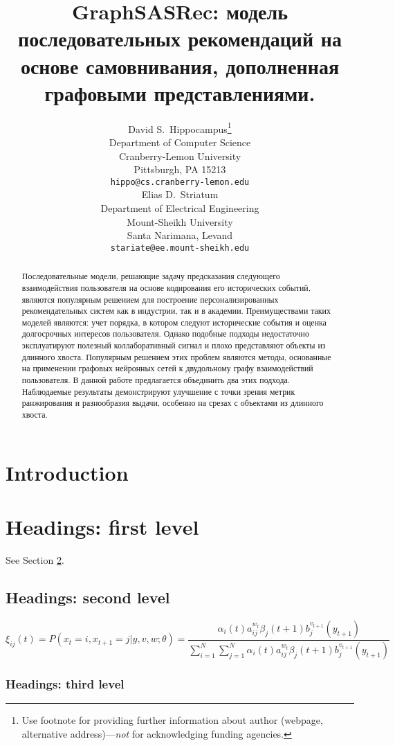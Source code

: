 \documentclass{article}
\title{GraphSASRec: модель последовательных рекомендаций на основе самовнивания, дополненная графовыми представлениями.}
\author{ David S.~Hippocampus\thanks{Use footnote for providing further
		information about author (webpage, alternative
		address)---\emph{not} for acknowledging funding agencies.} \\
	Department of Computer Science\\
	Cranberry-Lemon University\\
	Pittsburgh, PA 15213 \\
	\texttt{hippo@cs.cranberry-lemon.edu} \\
	\And
	Elias D.~Striatum \\
	Department of Electrical Engineering\\
	Mount-Sheikh University\\
	Santa Narimana, Levand \\
	\texttt{stariate@ee.mount-sheikh.edu} \\
}
\date{}
\begin{document}
\maketitle

\begin{abstract}
	Последовательные модели, решающие задачу предсказания следующего взаимодействия пользователя на 
	основе кодирования его исторических событий, являются популярным решением для построение 
	персонализированных рекомендательных систем как в индустрии, так и в академии. Преимуществами 
	таких моделей являются: учет порядка, в котором следуют исторические события и оценка долгосрочных 
	интересов пользователя. Однако подобные подходы недостаточно эксплуатируют полезный коллаборативный 
	сигнал и плохо представляют объекты из длинного хвоста. Популярным решением этих проблем являются 
	методы, основанные на применении графовых нейронных сетей к двудольному графу взаимодействий 
	пользователя. В данной работе предлагается объединить два этих подхода. Наблюдаемые результаты 
	демонстрируют улучшение с точки зрения метрик ранжирования и разнообразия выдачи, особенно на 
	срезах с объектами из длинного хвоста.
\end{abstract}



\section{Introduction}
\lipsum[2]
\lipsum[3]

\section{Headings: first level}
\label{sec:headings}

\lipsum[4] See Section \ref{sec:headings}.

\subsection{Headings: second level}
\lipsum[5]
\begin{equation}
	\xi _{ij}(t)=P(x_{t}=i,x_{t+1}=j|y,v,w;\theta)= {\frac {\alpha _{i}(t)a^{w_t}_{ij}\beta _{j}(t+1)b^{v_{t+1}}_{j}(y_{t+1})}{\sum _{i=1}^{N} \sum _{j=1}^{N} \alpha _{i}(t)a^{w_t}_{ij}\beta _{j}(t+1)b^{v_{t+1}}_{j}(y_{t+1})}}
\end{equation}

\subsubsection{Headings: third level}
\lipsum[6]
\end{document}
